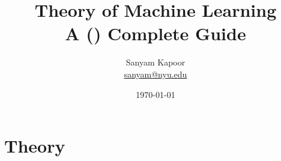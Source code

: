 \documentclass[12pt,a4paper]{book}
\title{\textbf{Theory of Machine Learning} \\ A (\text{not so}) Complete Guide}
\author{Sanyam Kapoor \\ \href{mailto:sanyam@nyu.edu}{sanyam@nyu.edu}}
\date{\today}
\begin{document}
\maketitle

\tableofcontents

\newpage

\part{Theory} \label{part:theory}







\begin{appendices}

\end{appendices}
\end{document}
